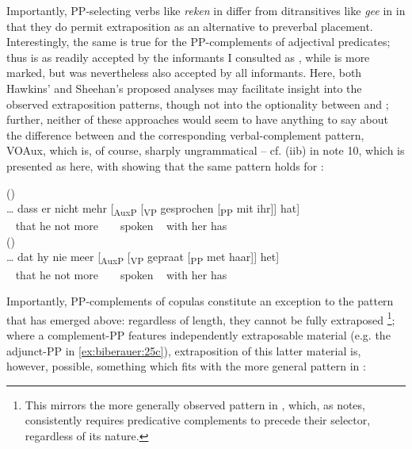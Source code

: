 \documentclass[output=paper]{LSP/langsci}
\begin{document}
Importantly, PP-selecting verbs like \textit{reken} in  differ from ditransitives like \textit{gee} in  in that they do permit extraposition as an alternative to preverbal placement. Interestingly, the same is true for the PP-complements of adjectival predicates; thus  is as readily accepted by the informants I consulted as , while  is more marked, but was nevertheless also accepted by all informants. Here, both Hawkins’ and Sheehan’s proposed analyses may facilitate insight into the observed extraposition patterns, though not into the optionality between  and ; further, neither of these approaches would seem to have anything to say about the difference between  and the corresponding verbal-complement pattern, VOAux, which is, of course, sharply ungrammatical – cf. (iib) in note 10, which is presented as  here, with  showing that the same pattern holds for :



\ea%
    \label{ex:biberauer:24}
  	  \ea () \label{ex:biberauer:24a}\\
\gll  *… dass er  nicht mehr [\textsubscript{AuxP} [\textsubscript{VP} gesprochen [\textsubscript{PP} mit  ihr]] hat]   \\
               ~   that  he not    more     ~ ~           spoken    ~        with her  has  \\
 \ex ()  \label{ex:biberauer:24b}\\
\gll   *… dat  hy nie meer [\textsubscript{AuxP} [\textsubscript{VP} gepraat [\textsubscript{PP} met  haar]] het]  \\
         ~  that he not more      ~ ~         spoken   ~   with  her    has  \\
\z
\z

Importantly, PP-complements of copulas constitute an exception to the pattern that has emerged above: regardless of length, they cannot be fully extraposed \footnote{This mirrors the more generally observed pattern in , which, as \citet[65]{Broekhuis2013} notes, consistently requires predicative complements to precede their selector, regardless of its nature.}; where a complement-PP features independently extraposable material (e.g. the adjunct-PP in \ref{ex:biberauer:25c}), extraposition of this latter material is, however, possible, something which fits with the more general pattern in : 
\end{document}

